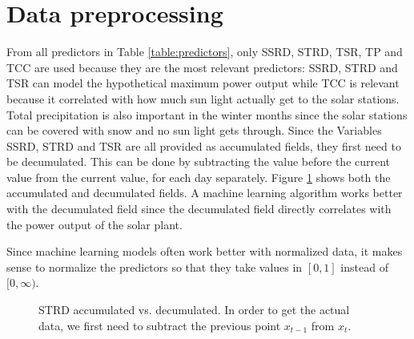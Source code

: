 \section{Data preprocessing}
\label{sec:data-preprocessing}

From all predictors in Table \ref{table:predictors}, only SSRD, STRD, TSR, TP and TCC are used 
because they are the most relevant predictors: SSRD, STRD and TSR can model the hypothetical maximum power 
output while TCC is relevant because it correlated with how much sun light actually get to the solar stations. 
Total precipitation is also important in the winter months since the solar stations can be covered with snow and no sun light gets through.
Since the Variables SSRD, STRD and TSR are all provided as accumulated fields, they first need to be decumulated.
This can be done by subtracting the value before the current value from the current value, for each day separately. 
Figure \ref{fig:strd-accumulated-vs-decumulated} shows both the accumulated and decumulated fields. 
A machine learning algorithm works better with the decumulated field since the decumulated field directly correlates 
with the power output of the solar plant.

Since machine learning models often work better with normalized data, it makes sense to normalize the predictors 
so that they take values in \([0,1]\) instead of \([0,\infty)\). 

\begin{figure}[h]%
    \centering
    \qquad
    \caption[STRD accumulated vs. decumulated]{STRD accumulated vs. decumulated. 
    In order to get the actual data, we first need to subtract the previous point \(x_{t-1}\) from \(x_t\).}%
    \label{fig:strd-accumulated-vs-decumulated}%
\end{figure}